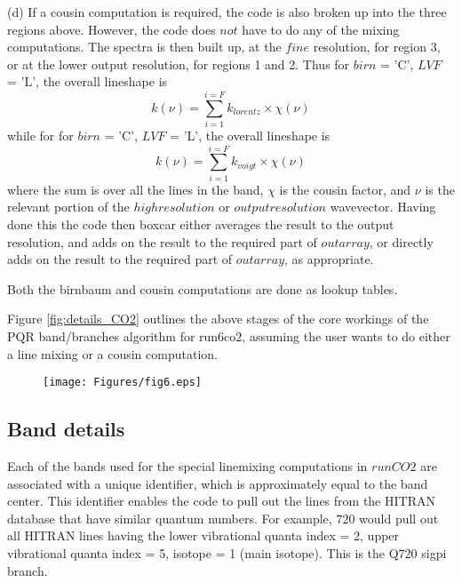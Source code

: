 \documentclass[11pt]{article}
\begin{document}
(d) If a cousin computation is required, the code is also broken up into the
    three regions above. However, the code does $not$ have to do any of the
    mixing computations. The spectra is then built up, at the $fine$
    resolution, for region 3, or at the lower output resolution, for 
    regions 1 and 2. Thus for $birn$ = 'C', $LVF$ = 'L', the overall 
    lineshape is
\begin{equation}
k(\nu) = \sum_{i=1}^{i=F} k_{lorentz} \times \chi(\nu)
\end{equation}
    while for for $birn$ = 'C', $LVF$ = 'L', the overall lineshape is
\begin{equation}
k(\nu) = \sum_{i=1}^{i=F} k_{voigt} \times \chi(\nu)
\end{equation}
    where the sum is over all the lines in the band, $\chi$ is the cousin 
    factor, and $\nu$ is the relevant portion of the $high resolution$ or 
    $output resolution$ wavevector. 
    Having done this the code then boxcar either averages the result to 
    the output resolution, and adds on the result to the required part of 
    $outarray$, or directly adds on the result to the required part of 
    $outarray$, as appropriate.

Both the birnbaum and cousin computations are done as lookup tables.

Figure \ref{fig:details_CO2} outlines the above stages of the core workings 
of the PQR band/branches algorithm for run6co2, assuming the user wants to 
do either a line mixing or a cousin computation.

\begin{figure}[h]
  \begin{center}\texttt{[image: Figures/fig6.eps]}\end{center}
  \caption[Core PQR band details for CO2]{}
  \label{fig:PQRloop_CO2}
\end{figure}

\subsection{Band details}
Each of the bands used for the special linemixing computations in $runCO2$ 
are associated with a unique identifier, which is approximately equal to the
band center. This identifier enables the code to pull out the lines from 
the HITRAN database that have similar quantum numbers. For example, $720$ 
would pull out all HITRAN lines having the lower vibrational quanta 
index = 2, upper vibrational quanta index = 5,  isotope = 1 (main isotope).
This is the Q720 sigpi branch.
\end{document}
